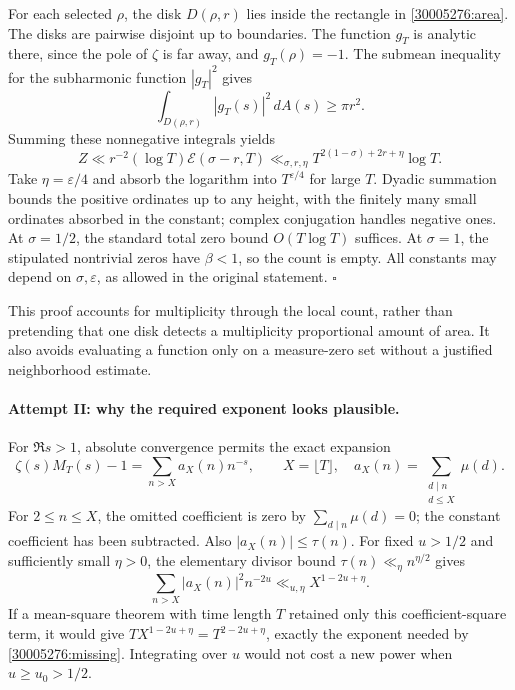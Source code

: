 \documentclass[11pt,a4paper]{article}
\numberwithin{equation}{section}
\begin{document}
For each selected $\rho$, the disk $D(\rho,r)$ lies inside the rectangle
in \eqref{30005276:area}.  The disks are pairwise disjoint up to boundaries.
The function $g_T$ is analytic there, since the pole of $\zeta$ is far
away, and $g_T(\rho)=-1$.  The submean inequality for the subharmonic
function $|g_T|^2$ gives
\[
 \int_{D(\rho,r)}|g_T(s)|^2\,dA(s)\geq\pi r^2.
\]
Summing these nonnegative integrals yields
\begin{equation}\label{30005276:detection}
 Z\ll r^{-2}(\log T)\mathcal E(\sigma-r,T)
   \ll_{\sigma,r,\eta}T^{2(1-\sigma)+2r+\eta}\log T.
\end{equation}
Take $\eta=\varepsilon/4$ and absorb the logarithm into
$T^{\varepsilon/4}$ for large $T$.  Dyadic summation bounds the positive
ordinates up to any height, with the finitely many small ordinates
absorbed in the constant; complex conjugation handles negative ones.
At $\sigma=1/2$, the standard total zero bound $O(T\log T)$ suffices.
At $\sigma=1$, the stipulated nontrivial zeros have $\beta<1$, so the
count is empty.  All constants may depend on $\sigma,\varepsilon$, as
allowed in the original statement. \hfill$\square$

This proof accounts for multiplicity through the local count, rather
than pretending that one disk detects a multiplicity proportional
amount of area.  It also avoids evaluating a function only on a
measure-zero set without a justified neighborhood estimate.

\paragraph{Attempt II: why the required exponent looks plausible.}
For $\Re s>1$, absolute convergence permits the exact expansion
\begin{equation}\label{30005276:coefficients}
 \zeta(s)M_T(s)-1=\sum_{n>X}a_X(n)n^{-s},\qquad
 X=\lfloor T\rfloor,\quad
 a_X(n)=\sum_{\substack{d\mid n\\d\leq X}}\mu(d).
\end{equation}
For $2\leq n\leq X$, the omitted coefficient is zero by
$\sum_{d\mid n}\mu(d)=0$; the constant coefficient has been subtracted.
Also $|a_X(n)|\leq\tau(n)$.  For fixed $u>1/2$ and sufficiently small
$\eta>0$, the elementary divisor bound $\tau(n)\ll_\eta n^{\eta/2}$ gives
\begin{equation}\label{30005276:diagonal}
 \sum_{n>X}|a_X(n)|^2n^{-2u}
 \ll_{u,\eta}X^{1-2u+\eta}.
\end{equation}
If a mean-square theorem with time length $T$ retained only this
coefficient-square term, it would give
$T X^{1-2u+\eta}=T^{2-2u+\eta}$, exactly the exponent needed by
\eqref{30005276:missing}.  Integrating over $u$ would not cost a new power
when $u\geq u_0>1/2$.
\end{document}
